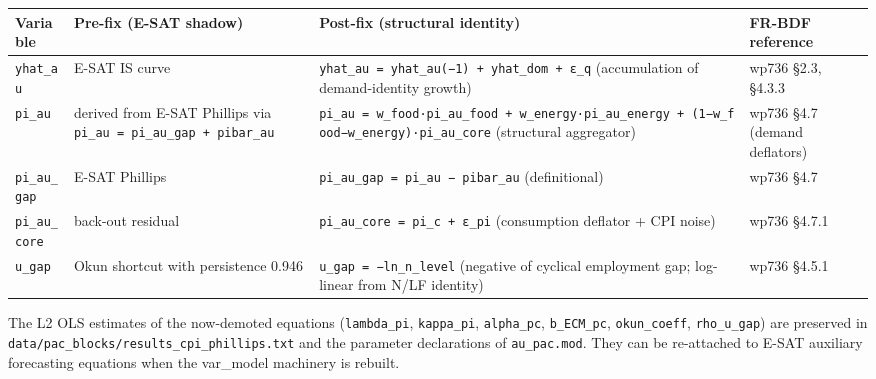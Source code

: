 \documentclass[
]{article}
\newcounter{none} %
\begin{document}
{\def\LTcaptype{none} %
\begin{longtable}[]{@{}
  >{\raggedright\arraybackslash}p{}
  >{\raggedright\arraybackslash}p{}
  >{\raggedright\arraybackslash}p{}
  >{\raggedright\arraybackslash}p{}@{}}
\toprule\noalign{}
\begin{minipage}[b]{\linewidth}\raggedright
Variable
\end{minipage} & \begin{minipage}[b]{\linewidth}\raggedright
Pre-fix (E-SAT shadow)
\end{minipage} & \begin{minipage}[b]{\linewidth}\raggedright
Post-fix (structural identity)
\end{minipage} & \begin{minipage}[b]{\linewidth}\raggedright
FR-BDF reference
\end{minipage} \\
\midrule\noalign{}
\endhead
\bottomrule\noalign{}
\endlastfoot
\texttt{yhat\_au} & E-SAT IS curve &
\texttt{yhat\_au\ =\ yhat\_au(−1)\ +\ yhat\_dom\ +\ ε\_q} (accumulation
of demand-identity growth) & wp736 §2.3, §4.3.3 \\
\texttt{pi\_au} & derived from E-SAT Phillips via
\texttt{pi\_au\ =\ pi\_au\_gap\ +\ pibar\_au} &
\texttt{pi\_au\ =\ w\_food·pi\_au\_food\ +\ w\_energy·pi\_au\_energy\ +\ (1−w\_food−w\_energy)·pi\_au\_core}
(structural aggregator) & wp736 §4.7 (demand deflators) \\
\texttt{pi\_au\_gap} & E-SAT Phillips &
\texttt{pi\_au\_gap\ =\ pi\_au\ −\ pibar\_au} (definitional) & wp736
§4.7 \\
\texttt{pi\_au\_core} & back-out residual &
\texttt{pi\_au\_core\ =\ pi\_c\ +\ ε\_pi} (consumption deflator + CPI
noise) & wp736 §4.7.1 \\
\texttt{u\_gap} & Okun shortcut with persistence 0.946 &
\texttt{u\_gap\ =\ −ln\_n\_level} (negative of cyclical employment gap;
log-linear from N/LF identity) & wp736 §4.5.1 \\
\end{longtable}
}

The L2 OLS estimates of the now-demoted equations (\texttt{lambda\_pi},
\texttt{kappa\_pi}, \texttt{alpha\_pc}, \texttt{b\_ECM\_pc},
\texttt{okun\_coeff}, \texttt{rho\_u\_gap}) are preserved in
\texttt{data/pac\_blocks/results\_cpi\_phillips.txt} and the parameter
declarations of \texttt{au\_pac.mod}. They can be re-attached to E-SAT
auxiliary forecasting equations when the var\_model machinery is
rebuilt.
\end{document}
